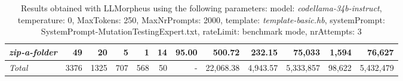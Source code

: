 \begin{table*}
{\begin{tabular}{l||r|r|r|r|r|r||r|r||r|r|r}
   \hline
   \textit{zip-a-folder} & 49 & 20 & 5 & 1 & 14 & 95.00 & 500.72 & 232.15 & 75,033 & 1,594 & 76,627 \\ 
   \hline
   \textit{Total} & 3376 & 1325 & 707 & 568 & 50 & - & 22,068.38  & 4,943.57 & 5,333,857 & 98,622 & 5,432,479 \\ 
 \end{tabular}
 }
 \caption{Results obtained with LLMorpheus using the following parameters: 
   model: \textit{codellama-34b-instruct}, 
   temperature: 0, 
   MaxTokens: 250, 
   MaxNrPrompts: 2000, 
   template: \textit{template-basic.hb}, 
   systemPrompt: SystemPrompt-MutationTestingExpert.txt, 
   rateLimit: benchmark mode, 
   nrAttempts: 3  
 }
\end{table*}

